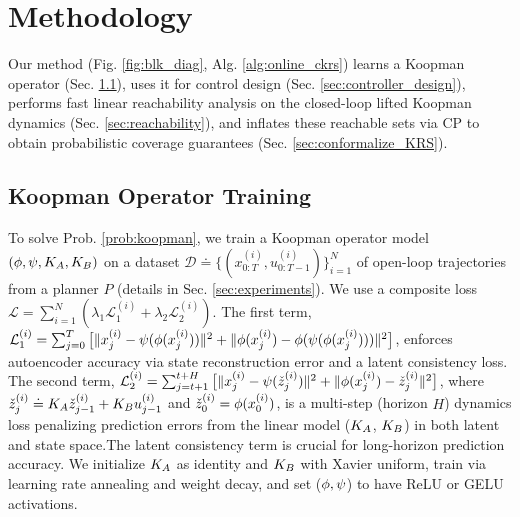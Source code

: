 
\section{Methodology}
\label{methodology}

Our method (Fig. \ref{fig:blk_diag}, Alg. \ref{alg:online_ckrs}) learns a Koopman operator (Sec. \ref{sec:koop_train}), uses it for control design (Sec. \ref{sec:controller_design}), performs fast linear reachability analysis on the closed-loop lifted Koopman dynamics (Sec. \ref{sec:reachability}), and inflates these reachable sets via CP to obtain probabilistic coverage guarantees (Sec. \ref{sec:conformalize_KRS}).

\subsection{Koopman Operator Training}
\label{sec:koop_train}
To solve Prob. \ref{prob:koopman}, we train a Koopman operator model $(\phi, \psi, K_{A}, K_{B})$ on a dataset $\mathcal{D} \doteq \{(x_{0:T}^{(i)}, u_{0:T-1}^{(i)})\}_{i=1}^N$ of open-loop trajectories from a planner $P$ (details in Sec. \ref{sec:experiments}). We use a composite loss $\mathcal{L} = \sum_{i=1}^N(\lambda_1 \mathcal{L}_1^{(i)} + \lambda_2 \mathcal{L}_2^{(i)})$. The first term, $\mathcal{L}_{\text{1}}^{(i)} = \sum_{j=0}^{T} \big[\|x_{j}^{(i)} - \psi (\phi (x_{j}^{(i)}))\|^2 + \|\phi(x_j^{(i)}) - \phi(\psi(\phi(x_j^{(i)})))\|^2\big]$, enforces autoencoder accuracy via state reconstruction error and a latent consistency loss. The second term, $\mathcal{L}_{\text{2}}^{(i)} = \sum_{j=t+1}^{t+H} \big[\| x_{j}^{(i)} - \psi (\check z_{j}^{(i)})\|^2 + \|\phi (x_{j}^{(i)}) - \check z_j^{(i)}\|^2\big]$, where $\check z_j^{(i)} \doteq K_{A} \check z_{j-1}^{(i)} + K_{B} u_{j-1}^{(i)}$ and $\check z_0^{(i)}=\phi(x_0^{(i)})$, is a multi-step (horizon $H$) dynamics loss penalizing prediction errors from the linear model ($K_{A}$, $K_{B}$) in both latent and state space.The latent consistency term is crucial for long-horizon prediction accuracy. We initialize $K_{A}$ as identity and $K_{B}$ with Xavier uniform, train via learning rate annealing and weight decay, and set ($\phi, \psi$) to have ReLU or GELU activations.
